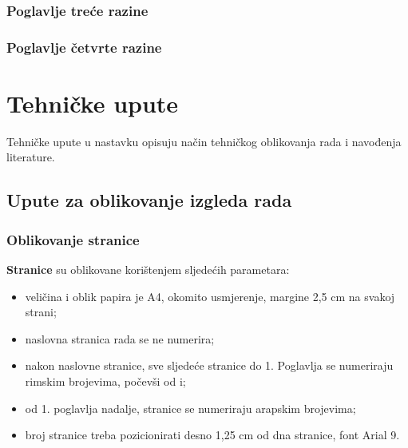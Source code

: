 \documentclass[]{foi}
\begin{document}
\lipsum[6]



\subsection{Poglavlje treće razine}

\lipsum[2]



\subsection{Poglavlje četvrte razine}

\lipsum[4-5]



\chapter{Tehničke upute}

Tehničke upute u nastavku opisuju način tehničkog oblikovanja rada i navođenja literature.



\section{Upute za oblikovanje izgleda rada}

\subsection{Oblikovanje stranice}

\textbf{Stranice} su oblikovane korištenjem sljedećih parametara:

\begin{itemize}
    \item veličina i oblik papira je A4, okomito usmjerenje, margine 2,5 cm na svakoj strani;

    \item naslovna stranica rada se ne numerira;

    \item nakon naslovne stranice, sve sljedeće stranice do 1. Poglavlja se numeriraju rimskim brojevima, počevši od i;

    \item od 1. poglavlja nadalje, stranice se numeriraju arapskim brojevima;

    \item broj stranice treba pozicionirati desno 1,25 cm od dna stranice, font Arial 9.
\end{itemize}
\end{document}
